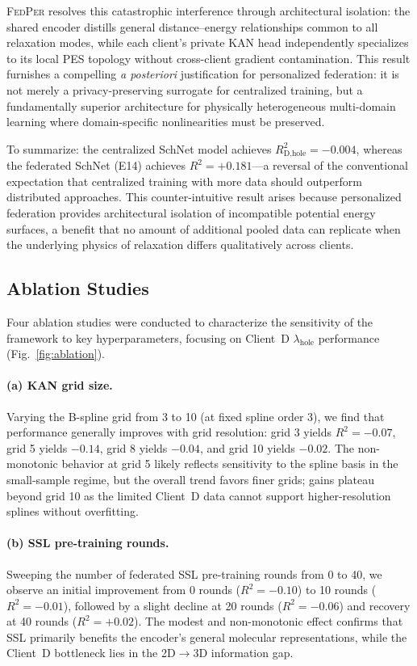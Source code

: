 \documentclass[twocolumn]{article}
\newcommand{\lamhole}{\lambda_{\text{hole}}}
\newcommand{\Rsq}{R^{2}}
\newcommand{\FedPer}{\textsc{FedPer}}
\begin{document}
\FedPer{} resolves this catastrophic interference through architectural isolation: the shared encoder distills general distance--energy relationships common to all relaxation modes, while each client's private KAN head independently specializes to its local PES topology without cross-client gradient contamination.
This result furnishes a compelling \emph{a posteriori} justification for personalized federation: it is not merely a privacy-preserving surrogate for centralized training, but a fundamentally superior architecture for physically heterogeneous multi-domain learning where domain-specific nonlinearities must be preserved.

To summarize: the centralized SchNet model achieves $\Rsq_{\text{D,hole}} = -0.004$, whereas the federated SchNet (E14) achieves $\Rsq = +0.181$---a reversal of the conventional expectation that centralized training with more data should outperform distributed approaches.
This counter-intuitive result arises because personalized federation provides architectural isolation of incompatible potential energy surfaces, a benefit that no amount of additional pooled data can replicate when the underlying physics of relaxation differs qualitatively across clients.

\subsection{Ablation Studies}\label{sec:ablation}

Four ablation studies were conducted to characterize the sensitivity of the framework to key hyperparameters, focusing on Client~D $\lamhole$ performance (Fig.~\ref{fig:ablation}).

\paragraph{(a) KAN grid size.}
Varying the B-spline grid from 3 to 10 (at fixed spline order 3), we find that performance generally improves with grid resolution: grid 3 yields $\Rsq = -0.07$, grid 5 yields $-0.14$, grid 8 yields $-0.04$, and grid 10 yields $-0.02$.
The non-monotonic behavior at grid 5 likely reflects sensitivity to the spline basis in the small-sample regime, but the overall trend favors finer grids; gains plateau beyond grid 10 as the limited Client~D data cannot support higher-resolution splines without overfitting.

\paragraph{(b) SSL pre-training rounds.}
Sweeping the number of federated SSL pre-training rounds from 0 to 40, we observe an initial improvement from 0 rounds ($\Rsq = -0.10$) to 10 rounds ($\Rsq = -0.01$), followed by a slight decline at 20 rounds ($\Rsq = -0.06$) and recovery at 40 rounds ($\Rsq = +0.02$).
The modest and non-monotonic effect confirms that SSL primarily benefits the encoder's general molecular representations, while the Client~D bottleneck lies in the 2D$\to$3D information gap.
\end{document}
